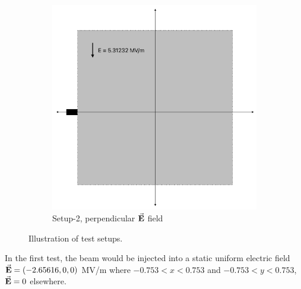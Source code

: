 \documentclass{book}
\begin{document}
\begin{figure}[H]
\begin{subfigure}{0.48\textwidth}
        \includegraphics[width=0.9\linewidth]{../../../figures/illustrations/statE_2.png}
        \caption*{Setup-2, perpendicular $\vec{\textbf{E}}$ field}
    \end{subfigure}
    \caption{Illustration of test setups.}
\end{figure}
In the first test, the beam would be injected into a static uniform electric field \\
$\vec{\textbf{E}}=(-2.65616, 0, 0)$ MV/m where $-0.753<x<0.753$ and $-0.753<y<0.753$, $\vec{\textbf{E}}=0$ elsewhere.
\end{document}
